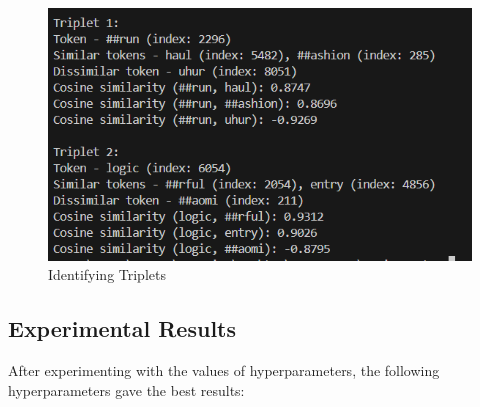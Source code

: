 \documentclass{article}
\begin{document}
\begin{figure}[H]
    \centering
    \includegraphics[width=0.65\linewidth]{image12.png}
    \caption{Identifying Triplets}
    \label{fig:enter-task1}
\end{figure}

\subsection{Experimental Results}
After experimenting with the values of hyperparameters, the following hyperparameters gave the best results:
\end{document}

